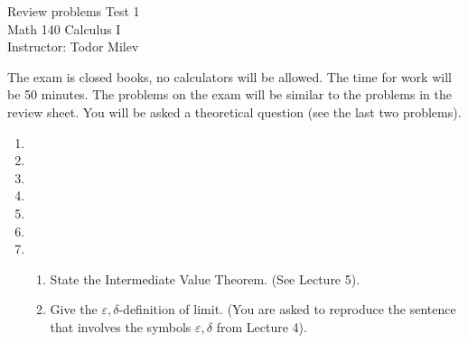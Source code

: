 \documentclass{article}
\begin{document}
\begin{center}
\Large
Review problems Test 1\\ Math 140 Calculus I \\ \normalsize Instructor: Todor Milev
\end{center}


\noindent The exam is closed books, no calculators will be allowed. The time for work will be 50 minutes. The problems on the exam will be similar to the problems in the review sheet. You will be asked a theoretical question (see the last two problems).

\begin{enumerate}
\item 
\item 
\item 


\item 
\item 
\item 
\item 
\begin{enumerate}
\item State the Intermediate Value Theorem. (See Lecture 5).
\item Give the $\varepsilon,\delta$-definition of limit. (You are asked to reproduce the sentence that involves the symbols $\varepsilon,\delta$ from Lecture 4).
\end{enumerate}
\end{enumerate}
\end{document}
